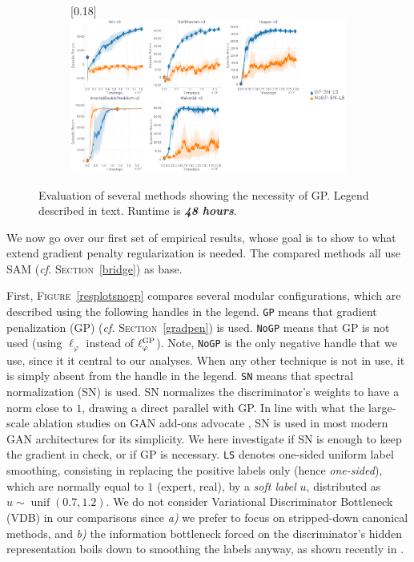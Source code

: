 \begin{figure}
  \center
  \begin{subfigure}[t]{0.99\textwidth}
    \center\scalebox{0.18}[0.18]{\includegraphics{Plots/fig03_gp_48h_5envs/plots_eval_env_ret_plot.pdf}}
  \end{subfigure}
  \caption{
  Evaluation of several methods showing the necessity of GP.
  Legend described in text.
  Runtime is \textbf{\emph{48 hours}}.}
  \label{resplotsgp2}
\end{figure}

We now go over our first set of empirical results, whose goal is to show
to what extend gradient penalty regularization is needed.
The compared methods all use SAM (\textit{cf.} \textsc{Section}~\ref{bridge})
as base.

First, \textsc{Figure}~\ref{resplotsnogp} compares several modular configurations,
which are described using the following handles in the legend.
\texttt{GP} means that gradient penalization (GP)
(\textit{cf.} \textsc{Section}~\ref{gradpen}) is used.
\texttt{NoGP} means that GP is not used
(using $\ell_\varphi$ instead of $\ell_\varphi^\textsc{GP}$).
Note, \texttt{NoGP} is the only negative handle that we use, since it it central to our analyses.
When any other technique is not in use, it is simply absent from the handle in the legend.
\texttt{SN} means that spectral normalization (SN) \cite{Miyato2018-wc} is used.
SN normalizes the discriminator's weights to have a norm close to $1$,
drawing a direct parallel with GP.
In line with what the large-scale ablation studies on GAN add-ons advocate
\cite{Lucic2017-nz,Kurach2018-cs}, SN is used in most modern GAN architectures for its simplicity.
We here investigate if SN is enough to keep the gradient in check, or if GP is necessary.
\texttt{LS} denotes one-sided uniform label smoothing, consisting in replacing
the positive labels only (hence \textit{one-sided}), which are normally equal to $1$ (expert, real),
by a \textit{soft label} $u$, distributed as $u \sim \operatorname{unif}(0.7,1.2)$.
We do not consider Variational Discriminator Bottleneck (VDB) \cite{Peng2018-mo}
in our comparisons since
\textit{a)} we prefer to focus on stripped-down canonical methods,
and \textit{b)} the information bottleneck forced on the discriminator's hidden representation
boils down to smoothing the labels anyway, as shown recently in \cite{Muller2019-rr}.

